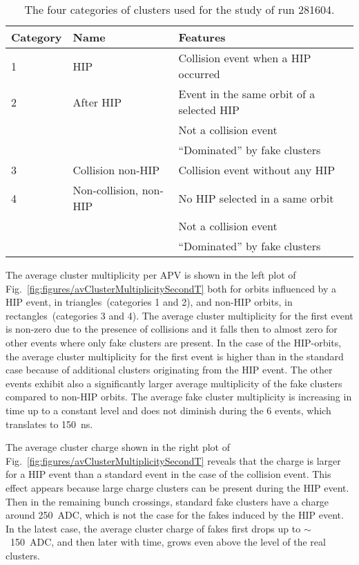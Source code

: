 \begin{table}[h]
\begin{center}
\begin{tabular}{|l|l|l|}
\hline
Category & Name  & Features \\
\hline
1 & HIP & Collision event when a HIP occurred \\
\hline
2 & After HIP & Event in the same orbit of a selected HIP \\
& & Not a collision event \\
& & ``Dominated'' by fake clusters \\
\hline
3 & Collision non-HIP & Collision event without any HIP \\
\hline
4 & Non-collision, non-HIP  & No HIP selected in a same orbit \\
& & Not a collision event \\
& & ``Dominated'' by fake clusters \\
\hline
\end{tabular}
\caption[Table caption text]{The four categories of clusters used for the study of run 281604. }
\label{tab:eventCategories}
\end{center}
\end{table}

The average cluster multiplicity per APV is shown in the left plot of Fig.~\ref{fig:figures/avClusterMultiplicitySecondT} both for orbits influenced by a HIP event, in triangles~(categories 1 and 2), and non-HIP orbits, in rectangles~(categories 3 and 4). The average cluster multiplicity for the first event is non-zero due to the presence of collisions and it falls then to almost zero for other events where only fake clusters are present. In the case of the HIP-orbits, the average cluster multiplicity for the first event is higher than in the standard case because of additional clusters originating from the HIP event. The other events exhibit also a significantly larger average multiplicity of the fake clusters compared to non-HIP orbits. The average fake cluster multiplicity is increasing in time up to a constant level and does not diminish during the 6 events, which translates to 150~ns. 

The average cluster charge shown in the right plot of Fig.~\ref{fig:figures/avClusterMultiplicitySecondT} reveals that the charge is larger for a HIP event than a standard event in the case of the collision event. This effect appears because large charge clusters can be present during the HIP event. Then in the remaining bunch crossings, standard fake clusters have a charge around 250~ADC, which is not the case for the fakes induced by the HIP event. In the latest case, the average cluster charge of fakes first drops up to $\sim$~150~ADC, and then later with time, grows even above the level of the real clusters. 


